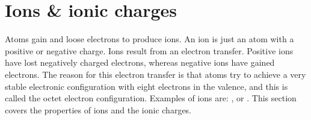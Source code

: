 \documentclass[main.tex]{subfiles}
\begin{document}
\section{Ions \& ionic charges}
Atoms gain and loose electrons to produce ions. An ion is just an atom with a positive or negative charge. Ions result from an electron transfer. Positive ions have lost negatively charged electrons, whereas negative ions have gained electrons. The reason for this electron transfer is that atoms try to achieve a very stable electronic configuration with eight electrons in the valence, and this is called the octet electron configuration. Examples of ions are: ,  or . This section covers the properties of ions and the ionic charges.\sloppy 
   
\end{document}
